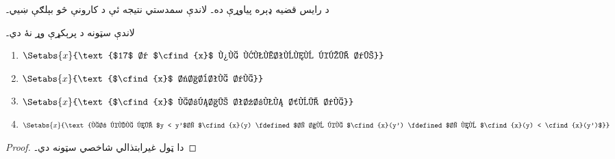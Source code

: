 \documentclass[../../../include/open-logic-section]{subfiles}
\begin{document}
د رايس قضيه ډېره پياوړې ده۔ لاندې سمدستي نتيجه ئې د کارونې څو
بېلګې ښيي۔
\begin{cor}
لاندې سټونه د پرېکړې وړ نۀ دي۔
\begin{enumerate}
\item $\Setabs{x}{\text{$17$ د $\cfind{x}$ په قيمتونو کښې دے}}$
\item $\Setabs{x}{\text{$\cfind{x}$ ثابته ده}}$
\item $\Setabs{x}{\text{$\cfind{x}$ هرځاے تعريف شوې ده}}$
\item $\Setabs{x}{\text{هر کله چې $y < y'$، $\cfind{x}(y) \fdefined$، او
    که $\cfind{x}(y') \fdefined$، نو $\cfind{x}(y) < \cfind{x}(y')$}}$
\end{enumerate}
\end{cor}

\begin{proof}
  دا ټول غيرابتذالي شاخصي سټونه دي۔
\end{proof}
\end{document}
